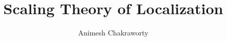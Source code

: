 \documentclass[12pt,a4paper]{article}
\title{Scaling Theory of Localization}
\author{Animesh Chakraworty}
\date{}
\begin{document}
\maketitle
\begin{abstract}
\end{abstract}






\printbibliography

\appendix
\end{document}
